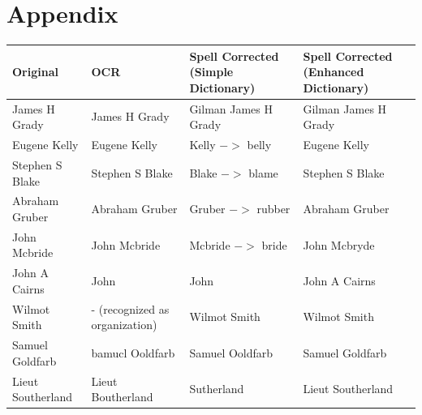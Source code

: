 \documentclass[letterpaper,11pt]{report}
\begin{document}
%

%
%


\chapter*{Appendix}\label{chapter:appendix} 

\begin{table}[h]
\centering
\begin{tabular}{|l|p{3cm}|p{3.5cm}|p{3.5cm}|}
\hline
\textbf{Original}        & \textbf{OCR}                   & \textbf{Spell Corrected (Simple Dictionary)}         & \textbf{Spell Corrected (Enhanced Dictionary)} \\ \hline
James H Grady            & James H Grady  \cellcolor[gray]{.8}                & Gilman James H Grady      & Gilman James H Grady         \\ \hline
Eugene Kelly             & Eugene Kelly  \cellcolor[gray]{.8}                 & Kelly $-$$>$ belly   & Eugene Kelly    \cellcolor[gray]{.8}             \\ \hline
Stephen S Blake          & Stephen S Blake \cellcolor[gray]{.8}               & Blake $-$$>$ blame   & Stephen S Blake   \cellcolor[gray]{.8}           \\ \hline
Abraham Gruber           & Abraham Gruber \cellcolor[gray]{.8}                & Gruber $-$$>$ rubber & Abraham Gruber  \cellcolor[gray]{.8}             \\ \hline
John Mcbride             & John Mcbride  \cellcolor[gray]{.8}                 & Mcbride $-$$>$ bride & John Mcbryde                 \\ \hline
John A Cairns            & John                           & John                      & John A Cairns   \cellcolor[gray]{.8}             \\ \hline
Wilmot Smith             & - (recognized as organization) & Wilmot Smith \cellcolor[gray]{.8}              & Wilmot Smith    \cellcolor[gray]{.8}             \\ \hline
Samuel Goldfarb          & bamucl Ooldfarb                & Samuel Ooldfarb           & Samuel Goldfarb \cellcolor[gray]{.8}             \\ \hline
Lieut Southerland        & Lieut Boutherland              & Sutherland                & Lieut Southerland  \cellcolor[gray]{.8}          \\ \hline

\end{tabular}
\end{table}
\end{document}
